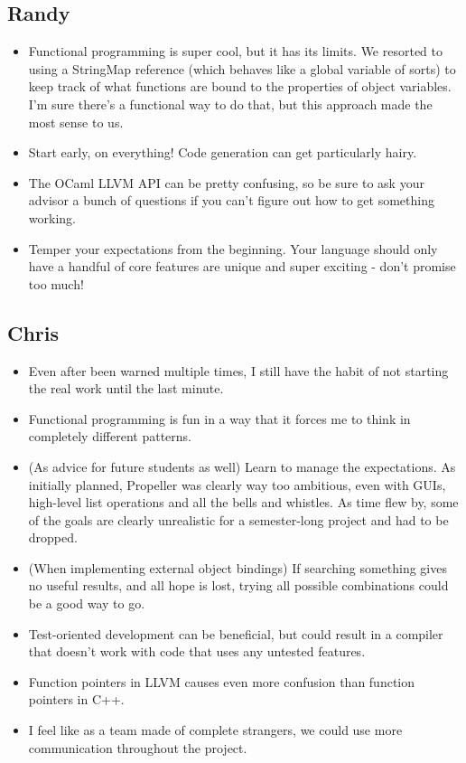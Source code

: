 \subsection{Randy}
\begin{itemize}
    \item Functional programming is super cool, but it has its limits. We resorted to using a
          StringMap reference (which behaves like a global variable of sorts) to keep track of what
          functions are bound to the properties of object variables. I'm sure there's a
          functional way to do that, but this approach made the most sense to us.
    \item Start early, on everything! Code generation can get particularly hairy.
    \item The OCaml LLVM API can be pretty confusing, so be sure to ask your advisor a bunch
          of questions if you can't figure out how to get something working.
    \item Temper your expectations from the beginning. Your language should only have a handful of
          core features are unique and super exciting - don't promise too much!
\end{itemize}

\subsection{Chris}
\begin{itemize}
\item Even after been warned multiple times, I still have the habit of not starting the real work
until the last minute.
\item Functional programming is fun in a way that it forces me to think in completely different
patterns.
\item (As advice for future students as well) Learn to manage the expectations. As initially
planned, Propeller was clearly way too ambitious, even with GUIs, high-level list operations and
all the bells and whistles. As time flew by, some of the goals are clearly unrealistic for a
semester-long project and had to be dropped.
\item (When implementing external object bindings) If searching something gives no useful results,
and all hope is lost, trying all possible combinations could be a good way to go.
\item Test-oriented development can be beneficial, but could result in a compiler that doesn't work
with code that uses any untested features.
\item Function pointers in LLVM causes even more confusion than function pointers in C++.
\item I feel like as a team made of complete strangers, we could use more communication throughout
the project.
\end{itemize}

